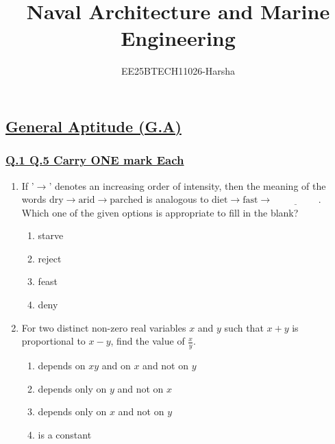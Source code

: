 \documentclass[journal]{IEEEtran}
\theoremstyle{remark}
\begin{document}

\onecolumn

\title{Naval Architecture and Marine Engineering}
\author{EE25BTECH11026-Harsha}
\maketitle

\renewcommand{\thefigure}{\theenumi}
\renewcommand{\thetable}{\theenumi}
\setcounter{secnumdepth}{0}
\subsection{\underline{\textbf{General Aptitude (G.A)}}}
\subsubsection{\underline{Q.1 \text{-} Q.5 Carry ONE mark Each}}
\setlength{\parskip}{1em}


\begin{enumerate}
 \item If '$\rightarrow$' denotes an increasing order of intensity, then the meaning of the words
\(\text{dry} \rightarrow \text{arid} \rightarrow \text{parched}\) is analogous to
\(\text{diet} \rightarrow \text{fast} \rightarrow \underline{\hspace{2cm}}\).
Which one of the given options is appropriate to fill in the blank? 
\begin{multicols}{4}
\begin{enumerate}
        \item starve
        \item reject
        \item feast
        \item deny 
\end{enumerate}
\end{multicols}
\end{enumerate}

\begin{enumerate}[itemsep=1em]
\setcounter{enumi}{1}

\item For two distinct non-zero real variables $x$ and $y$ such that $x + y$ is proportional to $x - y$, find the value of $\tfrac{x}{y}$.


\begin{enumerate}[ leftmargin=2.5em, labelsep=0.5em, itemsep=0.5em]
    \item depends on \(xy\) and on \(x\) and not on \(y\)
    \item depends only on \(y\) and not on \(x\)
    \item depends only on \(x\) and not on \(y\)
    \item is a constant \\
\end{enumerate}

\end{enumerate}
\end{document}
